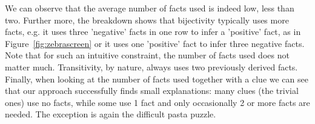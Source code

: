 We can observe that the average number of facts used is indeed low, less than two. Further more, the breakdown shows that bijectivity typically uses more facts, e.g. it uses three 'negative' facts in one row to infer a 'positive' fact, as in Figure~\ref{fig:zebrascreen} or it uses one 'positive' fact to infer three negative facts. Note that for such an intuitive constraint, the number of facts used does not matter much. Transitivity, by nature, always uses two previously derived facts. Finally, when looking at the number of facts used together with a clue we can see that our approach successfully finds small explanations: many clues (the trivial ones) use no facts, while some use 1 fact and only occasionally 2 or more facts are needed. The exception is again the difficult pasta puzzle.


\begin{table}
	\centering
	\caption{Puzzle explanation cost based on the cost function $f(I, C)$ and statistics on puzzle constraints}
	\label{table:sequence_leve}
\end{table}




